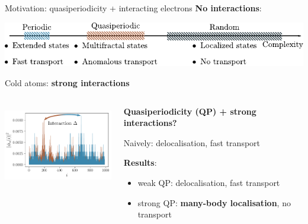 \begin{frame}{Motivation: quasiperiodicity + interacting electrons}
\textbf{No interactions}:

{
\centering
\includegraphics[width=\textwidth]{img/1_motivation/complexity.pdf}

}

Cold atoms: \textbf{strong interactions}

\begin{columns}
\begin{column}{0.4\textwidth}
\centering
\includegraphics[height=3.5cm]{img/0_cover/free_two_densities_interaction}
\end{column}
\begin{column}{0.6\textwidth}
\textbf{Quasiperiodicity (QP) + strong interactions?}

Naively: delocalisation, fast transport

\textbf{Results}: 
\begin{itemize}
	\item weak QP: delocalisation, fast transport
	\item strong QP: \textbf{many-body localisation}, no transport
\end{itemize}
\end{column}
\end{columns}
\end{frame}